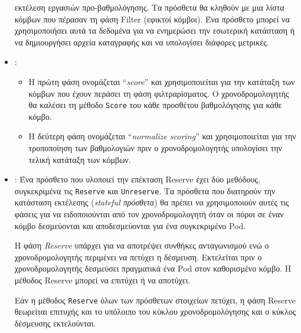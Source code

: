\begin{itemize}
            εκτέλεση εργασιών προ-βαθμολόγησης. Τα πρόσθετα θα κληθούν με μια
            λίστα κόμβων που πέρασαν τη φάση Filter (εφικτοί κόμβοι). Ένα
            πρόσθετο μπορεί να χρησιμοποιήσει αυτά τα δεδομένα για να ενημερώσει
            την εσωτερική κατάσταση ή να δημιουργήσει αρχεία καταγραφής και να
            υπολογίσει διάφορες μετρικές.
      \item
            \textbf{}:
            \begin{itemize}
                  \item
                        Η πρώτη φάση ονομάζεται ``\textit{score}'' και
                        χρησιμοποιείται για την κατάταξη των κόμβων που έχουν
                        περάσει τη φάση φιλτραρίσματος. Ο χρονοδρομολογητής θα
                        καλέσει τη μέθοδο \texttt{Score} του κάθε προσθέτου
                        βαθμολόγησης για κάθε κόμβο.
                  \item
                        Η δεύτερη φάση ονομάζεται ``\textit{normalize scoring}''
                        και χρησιμοποιείται για την τροποποίηση των βαθμολογιών
                        πριν ο χρονοδρομολογητής υπολογίσει την τελική κατάταξη
                        των κόμβων.
            \end{itemize}

      \item
            \textbf{}: Ένα πρόσθετο που υλοποιεί την επέκταση
            Reserve έχει δύο μεθόδους, συγκεκριμένα τις \texttt{Reserve} και
            \texttt{Unreserve}. Τα πρόσθετα που διατηρούν την κατάσταση
            εκτέλεσης (\textit{stateful πρόσθετα}) θα πρέπει να χρησιμοποιούν
            αυτές τις φάσεις για να ειδοποιούνται από τον χρονοδρομολογητή όταν
            οι πόροι σε έναν κόμβο δεσμεύονται και αποδεσμεύονται για ένα
            συγκεκριμένο Pod. 
            
            Η φάση \emph{Reserve} υπάρχει για να αποτρέψει συνθήκες ανταγωνισμού
            ενώ ο χρονοδρομολογητής περιμένει να πετύχει η δέσμευση. Εκτελείται
            πριν ο χρονοδρομολογητής δεσμεύσει πραγματικά ένα Pod στον
            καθορισμένο κόμβο. Η μέθοδος Reserve μπορεί να επιτύχει ή να
            αποτύχει.
            
            Εάν η μέθοδος \texttt{Reserve} όλων των πρόσθετων στοιχείων πετύχει,
            η φάση Reserve θεωρείται επιτυχής και το υπόλοιπο του κύκλου
            χρονοδρομολόγησης και ο κύκλος δέσμευσης εκτελούνται.


\end{itemize}

